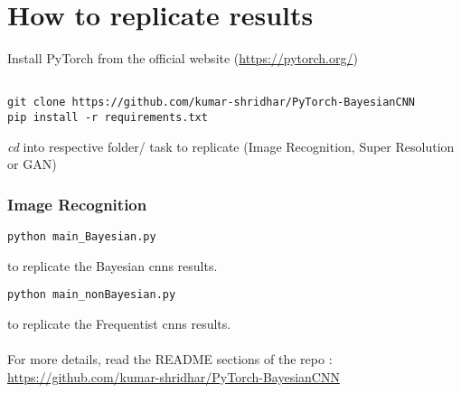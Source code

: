 
\chapter{How to replicate results}

Install PyTorch from the official website (\url{https://pytorch.org/})

\begin{verbatim} 

git clone https://github.com/kumar-shridhar/PyTorch-BayesianCNN
pip install -r requirements.txt

\end{verbatim}
\textit{cd} into respective folder/ task to replicate (Image Recognition, Super Resolution or GAN)

\subsection{Image Recognition}

\begin{verbatim} 
python main_Bayesian.py
\end{verbatim}

to replicate the Bayesian \acp{cnn} results.

\begin{verbatim} 
python main_nonBayesian.py
\end{verbatim}

to replicate the Frequentist \acp{cnn} results.\\

\\For more details, read the README sections of the repo : \url{https://github.com/kumar-shridhar/PyTorch-BayesianCNN}


